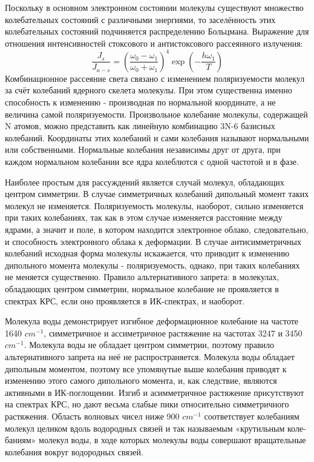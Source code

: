 \documentclass{article}
\begin{document}
Поскольку в основном электронном состоянии молекулы существуют множество колебательных состояний с различными энергиями, то заселённость этих колебательных состояний подчиняется распределению Больцмана. Выражение для отношения интенсивностей стоксового и антистоксового рассеянного излучения:
\[\frac{J_s}{J_{a-s}} = \left(\frac{\omega_0 - \omega_1}{\omega_0 + \omega_1}\right)^4\exp\left(-\frac{h\omega_1}{T}\right)\]
Комбинационное рассеяние света связано с изменением поляризуемости молекул за счёт колебаний ядерного скелета молекулы. При этом существенна именно способность к изменению - производная по нормальной координате, а не величина самой поляризуемости. Произвольное колебание молекулы, содержащей N атомов, можно представить как линейную комбинацию 3N-6 базисных колебаний. Координаты этих колебаний и сами колебания называют нормальными или собственными. Нормальные колебания независимы друг от друга, при каждом нормальном колебании все ядра колеблются с одной частотой и в фазе.

Наиболее простым для рассуждений является случай молекул, обладающих центром симметрии. В случае симметричных колебаний дипольный момент таких молекул не изменяется. Поляризуемость молекулы, наоборот, сильно изменяется при таких колебаниях, так как в этом случае изменяется расстояние между ядрами, а значит и поле, в котором находится электронное облако, следовательно, и способность электронного облака к деформации. В случае антисимметричных колебаний исходная форма молекулы искажается, что приводит к изменению дипольного момента молекулы - поляризуемость, однако, при таких колебаниях не меняется существенно. Правило альтернативного запрета: в молекулах, обладающих центром симметрии, нормальное колебание не проявляется в спектрах КРС, если оно проявляется в ИК-спектрах, и наоборот.

Молекула воды демонстрирует изгибное деформационное колебание на частоте 1640 $ cm^{-1}$, симметричное и ассиметричное растяжение на частотах 3247 и 3450 $ cm^{-1}$. Молекула воды не обладает центром симметрии, поэтому правило альтернативного запрета на неё не распространяется. Молекула воды обладает дипольным моментом, поэтому все упомянутые выше колебания приводят к изменению этого самого дипольного момента, и, как следствие, являются активными в ИК-поглощении. Изгиб и асимметричное растяжение присутствуют на спектрах КРС, но дают весьма слабые пики относительно симметричного растяжения. Область волновых чисел ниже 900 $cm^{-1}$ соответствует колебаниям молекул целиком вдоль водородных связей и так называемым «крутильным коле-
баниям» молекул воды, в ходе которых молекулы воды совершают вращательные колебания
вокруг водородных связей.
\end{document}
